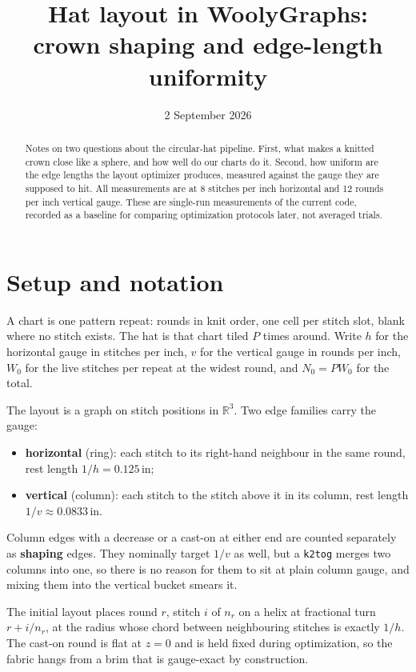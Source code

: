 \documentclass[11pt]{article}
\title{Hat layout in WoolyGraphs:\\crown shaping and edge-length uniformity}
\author{}
\date{2 September 2026}
\begin{document}
\maketitle

\begin{abstract}
Notes on two questions about the circular-hat pipeline. First, what makes a
knitted crown close like a sphere, and how well do our charts do it. Second,
how uniform are the edge lengths the layout optimizer produces, measured
against the gauge they are supposed to hit. All measurements are at
8 stitches per inch horizontal and 12 rounds per inch vertical
gauge. These are single-run measurements of the current code, recorded as a
baseline for comparing optimization protocols later, not averaged trials.
\end{abstract}

\section{Setup and notation}

A chart is one pattern repeat: rounds in knit order, one cell per stitch slot,
blank where no stitch exists. The hat is that chart tiled $P$ times around.
Write $h$ for the horizontal gauge in stitches per inch, $v$ for the vertical
gauge in rounds per inch, $W_0$ for the live stitches per repeat at the widest
round, and $N_0 = P W_0$ for the total.

The layout is a graph on stitch positions in $\mathbb{R}^3$. Two edge families
carry the gauge:
\begin{itemize}
  \item \textbf{horizontal} (ring): each stitch to its right-hand neighbour in
        the same round, rest length $1/h = 0.125\,\text{in}$;
  \item \textbf{vertical} (column): each stitch to the stitch above it in its
        column, rest length $1/v \approx 0.0833\,\text{in}$.
\end{itemize}
Column edges with a decrease or a cast-on at either end are counted separately
as \textbf{shaping} edges. They nominally target $1/v$ as well, but a
\texttt{k2tog} merges two columns into one, so there is no reason for them to
sit at plain column gauge, and mixing them into the vertical bucket smears it.

The initial layout places round $r$, stitch $i$ of $n_r$ on a helix at
fractional turn $r + i/n_r$, at the radius whose chord between neighbouring
stitches is exactly $1/h$. The cast-on round is flat at $z=0$ and is held fixed
during optimization, so the fabric hangs from a brim that is gauge-exact by
construction.
\end{document}
